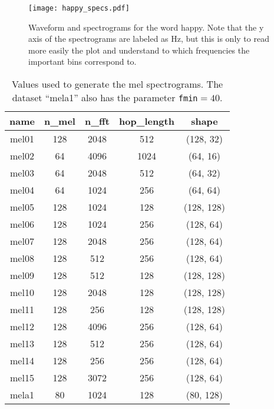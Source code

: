 \begin{figure}[t!]
    \centering
    \texttt{[image: happy\_specs.pdf]}
    \caption{
    Waveform and spectrograms for the word happy. Note that the y axis of the
spectrograms are labeled as Hz, but this is only to read more easily the plot
and understand to which frequencies the important bins correspond to. }%
    \label{fig:happy_specs}
\end{figure}

\begin{table}[t!]
    \centering
    \caption{
    Values used to generate the mel spectrograms. The dataset ``mela1'' also
has the parameter \texttt{fmin}$=40$.}
    \label{tab:mel_values}
    \begin{tabular}{|c|cccc|}
        \hline
        name & n\_mel & n\_fft & hop\_length & shape \\
        \hline
        mel01 & 128 & 2048 & 512   & (128, 32) \\
        mel02 & 64  & 4096 & 1024  & (64, 16) \\
        mel03 & 64  & 2048 & 512   & (64, 32) \\
        mel04 & 64  & 1024 & 256   & (64, 64) \\
        mel05 & 128 & 1024 & 128   & (128, 128) \\
        mel06 & 128 & 1024 & 256   & (128, 64) \\
        mel07 & 128 & 2048 & 256   & (128, 64) \\
        mel08 & 128 & 512  & 256   & (128, 64) \\
        mel09 & 128 & 512  & 128   & (128, 128) \\
        mel10 & 128 & 2048 & 128   & (128, 128) \\
        mel11 & 128 & 256  & 128   & (128, 128) \\
        mel12 & 128 & 4096 & 256   & (128, 64) \\
        mel13 & 128 & 512  & 256   & (128, 64) \\
        mel14 & 128 & 256  & 256   & (128, 64) \\
        mel15 & 128 & 3072 & 256   & (128, 64) \\
        mela1 & 80  & 1024 & 128   & (80, 128) \\
        \hline
    \end{tabular}
\end{table}

